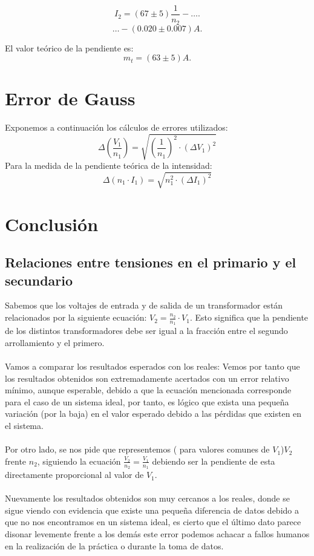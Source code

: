 \documentclass[11pt,letterpaper,twocolumn]{article}
\begin{document}
	\begin{tcolorbox}[colback=blue!5!white,colframe=blue!75!black,fonttitle=\bfseries,title= \[
	I_1: 0.14 A
	.\] ]
		\[
			I_2=\left( 67 \pm 5  \right) \frac{1}{n_2} - \ldots 
		.\] 	 
		\[	
		\ldots-\left( 0.020 \pm 0.007 \right) A
		.\] 
\end{tcolorbox}
El valor teórico de la pendiente es:
\[
	m_t=(63 \pm 5) A
.\]
\section{Error de Gauss}%
\label{sec:Error de Gauss}
Exponemos a continuación los cálculos de errores utilizados:
\begin{equation}
	\Delta \left( \frac{V_1}{n_1} \right) =\sqrt{\left( \frac{1}{ n_1} \right) ^2\cdot (\Delta V_1)^2} 
\end{equation}
Para la medida de la pendiente teórica de la intensidad:
\begin{equation}
	\Delta \left( n_1\cdot I_1 \right) =\sqrt{ n_1^2\cdot \left(\Delta I_1 \right)^2} 
\end{equation}
\section{Conclusión}%
\label{sec}
\subsection{Relaciones entre tensiones en el primario y el secundario}
Sabemos que los voltajes de entrada y de salida de un transformador están relacionados por la siguiente ecuación: $V_2=\frac{n_2}{n_1}\cdot V_1$. Esto significa que la pendiente de los distintos transformadores debe ser igual a la fracción entre el segundo arrollamiento y el primero.\\
\\
Vamos a comparar los resultados esperados con los reales:
Vemos por tanto que los resultados obtenidos son extremadamente acertados con un error relativo mínimo, aunque esperable, debido a que la ecuación mencionada corresponde para el caso de un sistema ideal, por tanto, es lógico que exista una pequeña variación (por la baja) en el valor esperado debido a las pérdidas que existen en el sistema.\\
\\
Por otro lado, se nos pide que representemos ( para valores comunes de $V_1$)$V_2$ frente  $n_2$, siguiendo la ecuación $\frac{V_2}{n_2}=\frac{V_1}{n_1}$  debiendo ser la pendiente de esta directamente proporcional al valor de $V_1$.\\  
\\
Nuevamente los resultados obtenidos son muy cercanos a los reales, donde se sigue viendo con evidencia que existe una pequeña diferencia de datos debido a que no nos encontramos en un sistema ideal, es cierto que el último dato parece disonar levemente frente a los demás este error podemos achacar a fallos humanos en la realización de la práctica o durante la toma de datos. 
\end{document}
